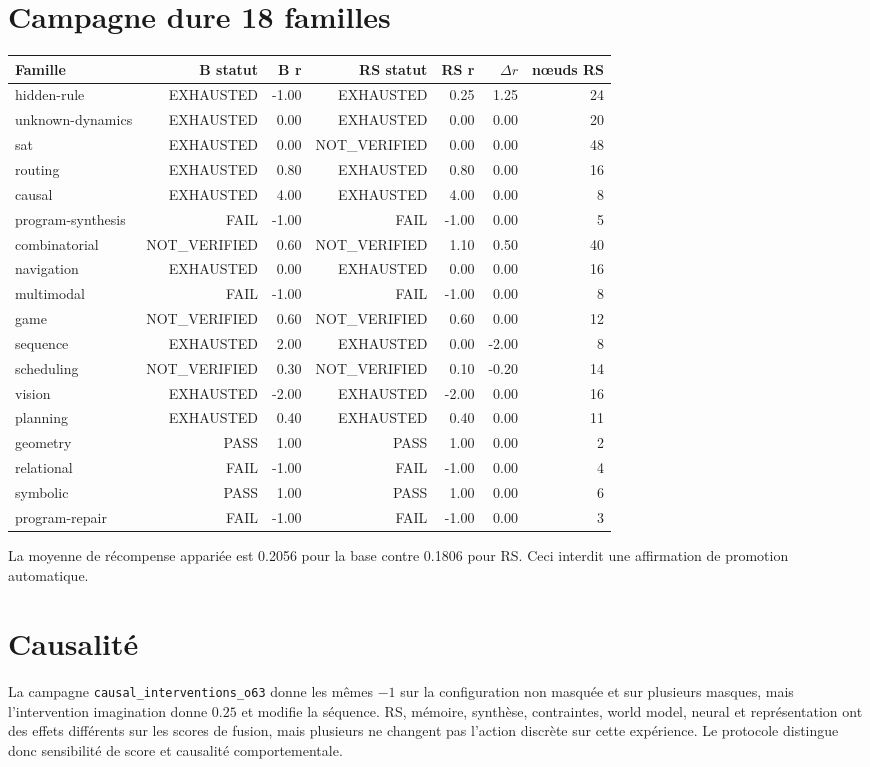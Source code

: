 \documentclass[11pt,a4paper]{article}
\newcommand{\code}[1]{\texttt{#1}}
\begin{document}
\section{Campagne dure 18 familles}

\begin{longtable}{lrrrrrr}
\toprule
Famille & B statut & B r & RS statut & RS r & $\Delta r$ & nœuds RS\\
\midrule
hidden-rule & EXHAUSTED & -1.00 & EXHAUSTED & 0.25 & 1.25 & 24\\
unknown-dynamics & EXHAUSTED & 0.00 & EXHAUSTED & 0.00 & 0.00 & 20\\
sat & EXHAUSTED & 0.00 & NOT\_VERIFIED & 0.00 & 0.00 & 48\\
routing & EXHAUSTED & 0.80 & EXHAUSTED & 0.80 & 0.00 & 16\\
causal & EXHAUSTED & 4.00 & EXHAUSTED & 4.00 & 0.00 & 8\\
program-synthesis & FAIL & -1.00 & FAIL & -1.00 & 0.00 & 5\\
combinatorial & NOT\_VERIFIED & 0.60 & NOT\_VERIFIED & 1.10 & 0.50 & 40\\
navigation & EXHAUSTED & 0.00 & EXHAUSTED & 0.00 & 0.00 & 16\\
multimodal & FAIL & -1.00 & FAIL & -1.00 & 0.00 & 8\\
game & NOT\_VERIFIED & 0.60 & NOT\_VERIFIED & 0.60 & 0.00 & 12\\
sequence & EXHAUSTED & 2.00 & EXHAUSTED & 0.00 & -2.00 & 8\\
scheduling & NOT\_VERIFIED & 0.30 & NOT\_VERIFIED & 0.10 & -0.20 & 14\\
vision & EXHAUSTED & -2.00 & EXHAUSTED & -2.00 & 0.00 & 16\\
planning & EXHAUSTED & 0.40 & EXHAUSTED & 0.40 & 0.00 & 11\\
geometry & PASS & 1.00 & PASS & 1.00 & 0.00 & 2\\
relational & FAIL & -1.00 & FAIL & -1.00 & 0.00 & 4\\
symbolic & PASS & 1.00 & PASS & 1.00 & 0.00 & 6\\
program-repair & FAIL & -1.00 & FAIL & -1.00 & 0.00 & 3\\
\bottomrule
\end{longtable}
La moyenne de récompense appariée est 0.2056 pour la base contre 0.1806 pour RS. Ceci interdit une affirmation de promotion automatique.

\section{Causalité}
La campagne \code{causal\_interventions\_o63} donne les mêmes $-1$ sur la configuration non masquée et sur plusieurs masques, mais l’intervention imagination donne $0.25$ et modifie la séquence. RS, mémoire, synthèse, contraintes, world model, neural et représentation ont des effets différents sur les scores de fusion, mais plusieurs ne changent pas l’action discrète sur cette expérience. Le protocole distingue donc sensibilité de score et causalité comportementale.
\end{document}
